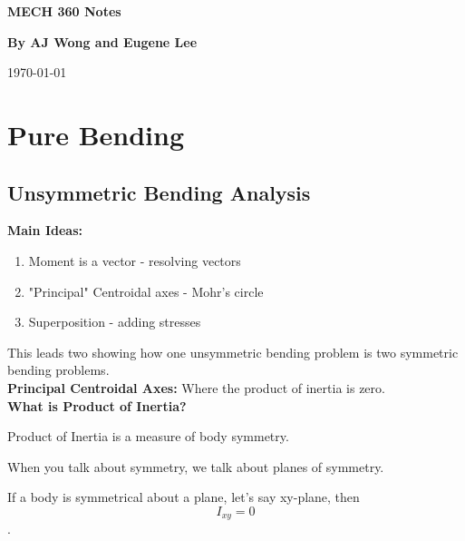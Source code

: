 \documentclass{article}
\numberwithin{equation}{subsection}
\begin{document}
\begin{titlepage}
    \title{}
    \author{}
    \date{}
    \begin{center}
        \vspace*{3cm}
            
        \Huge
        \textbf{MECH 360 Notes}
            
        \vspace{1cm}
 
        \vspace{1.5cm}
        \Large
        \textbf{By AJ Wong and Eugene Lee} \\                    %
   
        \vfill
   
        \vspace{1cm}

        \Large
        \today %
    \end{center}
\end{titlepage}

\tableofcontents

\newpage

\section{Pure Bending}
\subsection{Unsymmetric Bending Analysis}
\textbf{Main Ideas:}
\begin{enumerate}
  \item Moment is a vector - resolving vectors
  \item "Principal" Centroidal axes - Mohr's circle
  \item Superposition - adding stresses
\end{enumerate}
This leads two showing how one unsymmetric bending problem is two symmetric bending problems.
\\

\textbf{Principal Centroidal Axes:}
Where the product of inertia is zero. 
\\

\textbf{What is Product of Inertia?}

Product of Inertia is a measure of body symmetry.

When you talk about symmetry, we talk about planes of symmetry.

If a body is symmetrical about a plane, let's say xy-plane, then $$ I_{xy} = 0$$.
\end{document}
